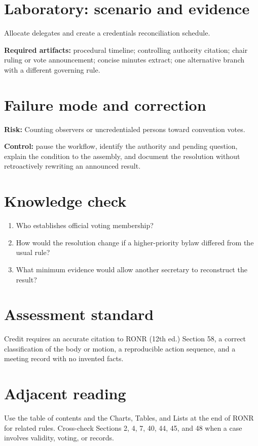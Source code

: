 \documentclass[11pt]{article}
\begin{document}
\section{Laboratory: scenario and evidence}
Allocate delegates and create a credentials reconciliation schedule.

\textbf{Required artifacts:} procedural timeline; controlling authority citation; chair ruling or vote announcement; concise minutes extract; one alternative branch with a different governing rule.

\section{Failure mode and correction}
\textbf{Risk:} Counting observers or uncredentialed persons toward convention votes.

\textbf{Control:} pause the workflow, identify the authority and pending question, explain the condition to the assembly, and document the resolution without retroactively rewriting an announced result.

\section{Knowledge check}
\begin{enumerate}[leftmargin=*,itemsep=4pt]
\item Who establishes official voting membership?
\item How would the resolution change if a higher-priority bylaw differed from the usual rule?
\item What minimum evidence would allow another secretary to reconstruct the result?
\end{enumerate}

\section{Assessment standard}
Credit requires an accurate citation to RONR (12th ed.) Section 58, a correct classification of the body or motion, a reproducible action sequence, and a meeting record with no invented facts.

\section{Adjacent reading}
Use the table of contents and the Charts, Tables, and Lists at the end of RONR for related rules. Cross-check Sections 2, 4, 7, 40, 44, 45, and 48 when a case involves validity, voting, or records.
\end{document}
